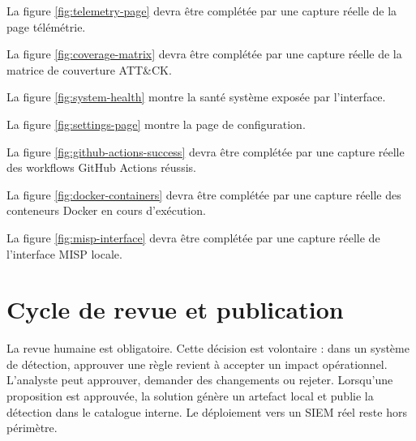 La figure \ref{fig:telemetry-page} devra être complétée par une capture réelle de la page télémétrie.

La figure \ref{fig:coverage-matrix} devra être complétée par une capture réelle de la matrice de couverture ATT\&CK.

La figure \ref{fig:system-health} montre la santé système exposée par l'interface.

La figure \ref{fig:settings-page} montre la page de configuration.

La figure \ref{fig:github-actions-success} devra être complétée par une capture réelle des workflows GitHub Actions réussis.

La figure \ref{fig:docker-containers} devra être complétée par une capture réelle des conteneurs Docker en cours d'exécution.

La figure \ref{fig:misp-interface} devra être complétée par une capture réelle de l'interface MISP locale.

\section{Cycle de revue et publication}

La revue humaine est obligatoire. Cette décision est volontaire : dans un système de détection, approuver une règle revient à accepter un impact opérationnel. L'analyste peut approuver, demander des changements ou rejeter. Lorsqu'une proposition est approuvée, la solution génère un artefact local et publie la détection dans le catalogue interne. Le déploiement vers un SIEM réel reste hors périmètre.


